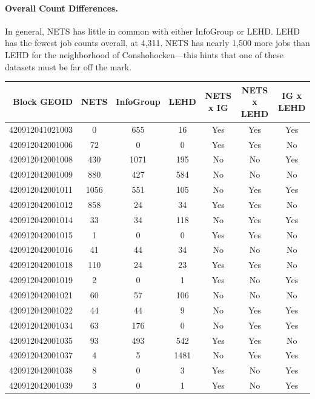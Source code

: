 \documentclass[paper = letter, fontsize = 11pt]{scrartcl}
\begin{document}
\paragraph{Overall Count Differences.} In general, NETS has little in common with either InfoGroup or LEHD. LEHD has the fewest job counts overall, at 4,311. NETS has nearly 1,500 more jobs than LEHD for the neighborhood of Conshohocken---this hints that one of these datasets must be far off the mark.
\clearpage
\pagestyle{empty}
\begin{table}
	\begin{center}
		\begin{tabular}{ r | c c c c c c }
			Block GEOID & NETS & InfoGroup & LEHD & NETS x IG & NETS x LEHD & IG x LEHD\\
			\hline
			\hline
			420912041021003 & 0 & 655 & 16 & Yes & Yes & Yes\\
			\hline 
			420912042001006 & 72 & 0 & 0 & Yes & Yes & No\\
			\hline 
			420912042001008 & 430 & 1071 & 195 & No & No & Yes\\
			\hline 
			420912042001009 & 880 & 427 & 584 & No & No & No\\
			\hline 
			420912042001011 & 1056 & 551 & 105 & No & Yes & Yes\\
			\hline 
			420912042001012 & 858 & 24 & 34 & Yes & Yes & No\\
			\hline 
			420912042001014 & 33 & 34 & 118 & No & Yes & Yes\\
			\hline 
			420912042001015 & 1 & 0 & 0 & Yes & Yes & No\\
			\hline 
			420912042001016 & 41 & 44 & 34 & No & No & No\\
			\hline 
			420912042001018 & 110 & 24 & 23 & Yes & Yes & No\\
			\hline 
			420912042001019 & 2 & 0 & 1 & Yes & No & Yes\\
			\hline 
			420912042001021 & 60 & 57 & 106 & No & No & No\\
			\hline 
			420912042001022 & 44 & 44 & 9 & No & Yes & Yes\\
			\hline 
			420912042001034 & 63 & 176 & 0 & No & Yes & Yes\\
			\hline 
			420912042001035 & 93 & 493 & 542 & Yes & Yes & No\\
			\hline 
			420912042001037 & 4 & 5 & 1481 & No & Yes & Yes\\
			\hline 
			420912042001038 & 8 & 0 & 3 & Yes & No & Yes\\
			\hline 
			420912042001039 & 3 & 0 & 1 & Yes & No & Yes\\

\end{tabular}
\end{center}
\end{table}
\end{document}
